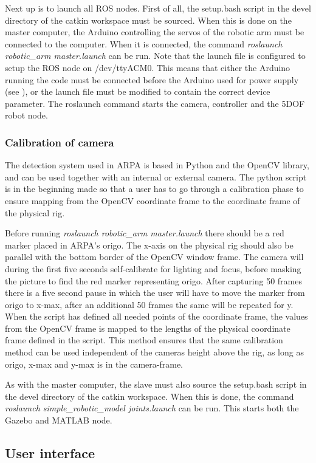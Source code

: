 \documentclass[11pt,a4paper, titlepage]{article}
\begin{document}
	Next up is to launch all ROS nodes. First of all, the setup.bash script in the devel directory of the catkin workspace must be sourced. When this is done on the master computer, the Arduino controlling the servos of the robotic arm must be connected to the computer. When it is connected, the command \textit{roslaunch robotic\_arm master.launch} can be run. Note that the launch file is configured to setup the ROS node on /dev/ttyACM0. This means that either the Arduino running the code must be connected before the Arduino used for power supply (see ), or the launch file must be modified to contain the correct device parameter. The roslaunch command starts the camera, controller and the 5DOF robot node. 
	
\subsubsection{Calibration of camera}
The detection system used in ARPA is based in Python and the OpenCV library, and can be used together with an internal or external camera. The python script is in the beginning made so that a user has to go through a calibration phase to ensure mapping from the OpenCV coordinate frame to the coordinate frame of the physical rig.

Before running \textit{roslaunch robotic\_arm master.launch} there should be a red marker placed in ARPA's origo. The x-axis on the physical rig should also be parallel with the bottom border of the OpenCV window frame. The camera will during the first five seconds self-calibrate for lighting and focus, before masking the picture to find the red marker representing origo. After capturing 50 frames there is a five second pause in which the user will have to move the marker from origo to x-max, after an additional 50 frames the same will be repeated for y. When the script has defined all needed points of the coordinate frame, the values from the OpenCV frame is mapped to the lengths of the physical coordinate frame defined in the script. This method ensures that the same calibration method can be used independent of the cameras height above the rig, as long as origo, x-max and y-max is in the camera-frame.
	
	As with the master computer, the slave must also source the setup.bash script in the devel directory of the catkin workspace. When this is done, the command \textit{roslaunch simple\_robotic\_model joints.launch} can be run. This starts both the Gazebo and MATLAB node.
	
	\subsection{User interface}
\end{document}
